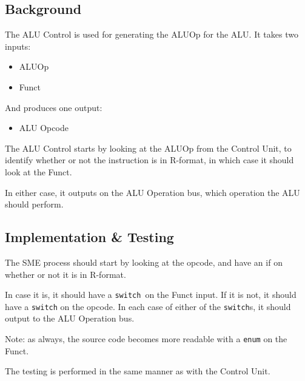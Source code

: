 \documentclass{beamer}
\begin{document}
\subsection{Background}
\begin{frame}
    The ALU Control is used for generating the ALUOp for the ALU. It takes two
    inputs:
    \begin{itemize}
        \item ALUOp
        \item Funct
    \end{itemize}
    And produces one output:
    \begin{itemize}
        \item ALU Opcode
    \end{itemize}
\end{frame}
\begin{frame}
    \begin{figure}
    \end{figure}
\end{frame}
\begin{frame}
    The ALU Control starts by looking at the ALUOp from the Control Unit, to
    identify whether or not the instruction is in R-format, in which case it
    should look at the Funct.

    \vspace{\baselineskip}
    In either case, it outputs on the ALU Operation bus, which operation the
    ALU should perform.
\end{frame}
\subsection{Implementation \& Testing}
\begin{frame}
    The SME process should start by looking at the opcode, and have an if on
    whether or not it is in R-format.

    \vspace{\baselineskip}
    In case it is, it should have a \texttt{switch} on the Funct input. If
    it is not, it should have a \texttt{switch} on the opcode. In each case of
    either of the \texttt{switch}s, it should output to the ALU Operation bus.

    \vspace{\baselineskip}
    Note: as always, the source code becomes more readable with a \texttt{enum}
    on the Funct.

    \vspace{\baselineskip}
    The testing is performed in the same manner as with the Control Unit.
\end{frame}
\end{document}
